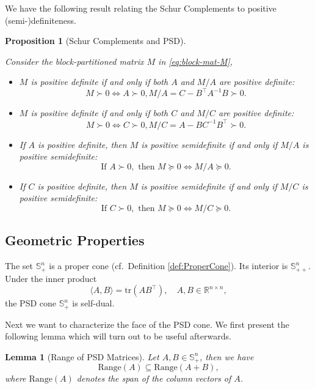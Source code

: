 \documentclass[
]{book}
\newtheorem{lemma}{Lemma}[chapter]
\newtheorem{proposition}{Proposition}[chapter]
\theoremstyle{definition}
\theoremstyle{definition}
\theoremstyle{definition}
\theoremstyle{definition}
\theoremstyle{remark}
\begin{document}
We have the following result relating the Schur Complements to positive (semi-)definiteness.

\begin{proposition}[Schur Complements and PSD]
\protect\hypertarget{prp:SchurPSD}{}\label{prp:SchurPSD}

Consider the block-partitioned matrix \(M\) in \eqref{eq:block-mat-M},

\begin{itemize}
\item
  \(M\) is positive definite if and only if both \(A\) and \(M/A\) are positive definite:
  \[
  M \succ 0 \Leftrightarrow A \succ 0, M/A = C - B^\top A^{-1}B \succ 0.
  \]
\item
  \(M\) is positive definite if and only if both \(C\) and \(M/C\) are positive definite:
  \[
  M \succ 0 \Leftrightarrow C \succ 0, M/C = A - B C^{-1}B^\top\succ 0.
  \]
\item
  If \(A\) is positive definite, then \(M\) is positive semidefinite if and only if \(M/A\) is positive semidefinite:
  \[
  \text{If } A \succ 0, \text{ then } M \succeq 0 \Leftrightarrow M / A \succeq 0.
  \]
\item
  If \(C\) is positive definite, then \(M\) is positive semidefinite if and only if \(M/C\) is positive semidefinite:
  \[
  \text{If } C \succ 0, \text{ then } M \succeq 0 \Leftrightarrow M / C \succeq 0.
  \]
\end{itemize}

\end{proposition}

\subsection{Geometric Properties}\label{geometric-properties}

The set \(\mathbb{S}^{n}_{+}\) is a proper cone (cf.~Definition \ref{def:ProperCone}). Its interior is \(\mathbb{S}^{n}_{++}\). Under the inner product
\[
\langle A, B \rangle = \mathrm{tr}(AB^\top), \quad A,B \in \mathbb{R}^{n \times n},
\]
the PSD cone \(\mathbb{S}^{n}_{+}\) is self-dual.

Next we want to characterize the face of the PSD cone. We first present the following lemma which will turn out to be useful afterwards.

\begin{lemma}[Range of PSD Matrices]
\protect\hypertarget{lem:PSDRange}{}\label{lem:PSDRange}Let \(A,B \in \mathbb{S}^{n}_{+}\), then we have
\begin{equation}
\mathrm{Range}(A) \subseteq \mathrm{Range}(A + B),
\label{eq:Range-PSD}
\end{equation}
where \(\mathrm{Range}(A)\) denotes the span of the column vectors of \(A\).
\end{lemma}
\end{document}
